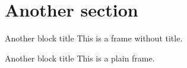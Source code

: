 \section{Another section}

\begin{frame}
  \begin{block}{Another block title}
    This is a frame without title.
  \end{block}
\end{frame}

\begin{frame}[plain]
  \begin{block}{Another block title}
    This is a plain frame.
  \end{block}
\end{frame}
